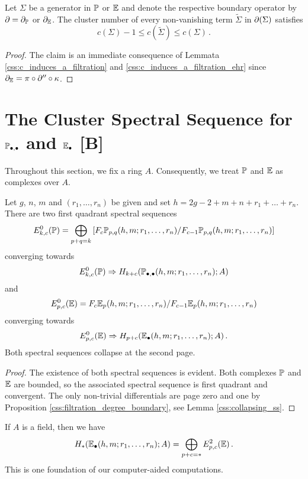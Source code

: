 \begin{prop}
    \label{css:filtration_degree_boundary}
    Let $\Sigma$ be a generator in $\mathbb P$ or $\mathbb E$ and denote the respective boundary operator by $\partial = \partial_{\mathbb P}$ or $\partial_\mathbb E$.
    The cluster number of every non-vanishing term $\tilde\Sigma$ in $\partial(\Sigma)$ satisfies
    \[
        c( \Sigma ) -1 \leq c( \tilde\Sigma ) \leq c(\Sigma) \,.
    \]
\end{prop}
\begin{proof}
    The claim is an immediate consequence of Lemmata \ref{css:c_induces_a_filtration} and \ref{css:c_induces_a_filtration_ehr} since $\partial_\mathbb E = \pi \circ \partial'' \circ \kappa$.
\end{proof}

\section{The Cluster Spectral Sequence for \texorpdfstring{$\mathbb P_{\bullet, \bullet}$}{P} and \texorpdfstring{$\mathbb E_\bullet$}{E} [B]}
\label{css:cluster_spectral_sequence_chapter}%
Throughout this section, we fix a ring $A$.
Consequently, we treat $\mathbb P$ and $\mathbb E$ as complexes over $A$.

\begin{prop}
    \label{css:cluster_spectral_sequence}
    Let $g$, $n$, $m$ and $(r_1, \ldots, r_n)$ be given and set $h = 2g-2+m+n+r_1 + \ldots + r_n$.
    There are two first quadrant spectral sequences
    \[
        E^0_{k,c}(\PP) = \bigoplus_{p+q=k}\left[F_c\PP_{p,q}(h,m;r_1, \ldots, r_n) / F_{c-1}\PP_{p,q}(h,m;r_1, \ldots, r_n) \right]
    \]
    converging towards
    \[
        E^0_{k,c}(\PP) \Rightarrow H_{k+c}( \PP_{\bullet, \bullet}(h,m;r_1, \ldots, r_n) ; A )
    \]
    and
    \[
        E^0_{p,c}(\E) = F_c\E_p(h,m;r_1, \ldots, r_n) / F_{c-1}\E_p(h,m;r_1, \ldots, r_n)
    \]
    converging towards
    \[
        E^0_{p,c}(\E) \Rightarrow H_{p+c}( \E_\bullet(h,m;r_1, \ldots, r_n); A ) \,.
    \]
    Both spectral sequences collapse at the second page.
\end{prop}
\begin{proof}
    The existence of both spectral sequences is evident.
    Both complexes $\mathbb P$ and $\mathbb E$ are bounded, so the associated spectral sequence is first quadrant and convergent.
    The only non-trivial differentials are page zero and one by Proposition \ref{css:filtration_degree_boundary}, see Lemma \ref{css:collapsing_ss}.
\end{proof}
\begin{rem}
If $A$ is a field, then we have
\[
    H_\ast( \E_\bullet(h,m;r_1, \ldots, r_n); A ) = \bigoplus_{p+c=\ast} E^2_{p,c}(\E) \,.
\]
This is one foundation of our computer-aided computations.
\end{rem}

